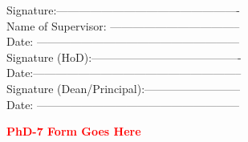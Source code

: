 \documentclass{article}
\begin{document}
\vspace{1cm}
\begin{flushright}
Signature:------------------------------------------------- \\	\vspace{.3cm}				Name of Supervisor: ----------------------------------- \\	\vspace{.3cm}			
Date: ------------------------------------------------------\\ \vspace{.8cm}
Signature (HoD):----------------------------------------\\	\vspace{.3cm}				
Date:--------------------------------------------------------\\ \vspace{.8cm}
Signature (Dean/Principal):--------------------------\\	\vspace{.3cm}		
Date: ------------------------------------------------------								
\end{flushright}
\newpage
{}
\thispagestyle{empty}
\begin{center}
    

\bf  \textcolor{red}{{PhD-7 Form Goes Here}}
\end{center}
\end{document}

